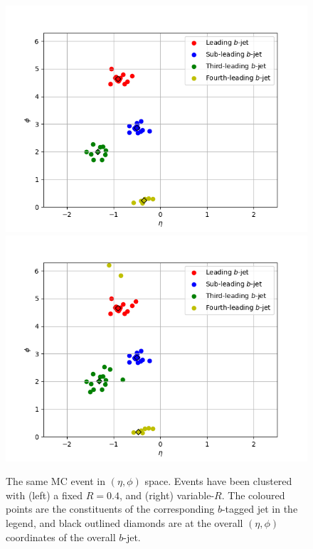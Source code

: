 \documentclass[12pt]{article}
\begin{document}
\begin{figure}[htb!]
	\begin{center}
	\includegraphics[scale=0.42]{plots/event_image_AK4.png}
	\includegraphics[scale=0.42]{plots/event_image_varR.png}
	 \end{center}
	\caption{The same MC event in $(\eta , \phi)$ space. Events have been clustered with (left) a fixed $R=0.4$, and (right) variable-$R$. The coloured points are the constituents of the corresponding $b$-tagged jet in the legend, and black outlined diamonds are at the overall $(\eta , \phi)$ coordinates of the overall $b$-jet.}
\label{fig:event_images}
\end{figure}
\end{document}
